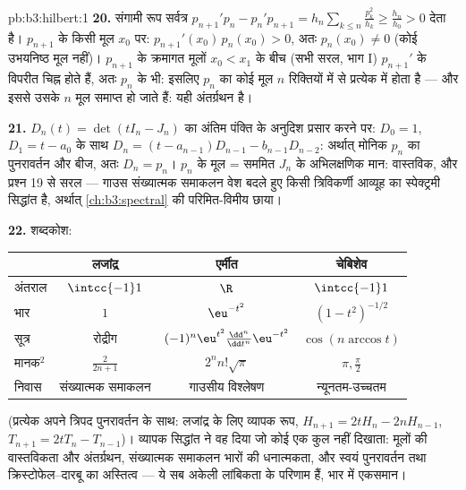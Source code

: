 \begin{solution}{pb:b3:hilbert:1}
\textbf{20.} संगामी रूप सर्वत्र $p_{n+1}'p_n -
p_n'p_{n+1} = h_n\sum_{k\leq n}\frac{p_k^2}{h_k} \geq
\frac{h_n}{h_0} > 0$ देता है। $p_{n+1}$ के किसी मूल
$x_0$ पर: $p_{n+1}'(x_0)\,p_n(x_0) > 0$, अतः $p_n(x_0) \neq
0$ (कोई उभयनिष्ठ मूल नहीं)। $p_{n+1}$ के क्रमागत
मूलों $x_0 < x_1$ के बीच (सभी सरल, भाग I) $p_{n+1}'$ के विपरीत चिह्न होते हैं,
अतः $p_n$ के भी: इसलिए $p_n$ का कोई मूल $n$ रिक्तियों में से
प्रत्येक में होता है --- और इससे उसके $n$ मूल समाप्त हो जाते हैं:
यही अंतर्ग्रथन है।

\textbf{21.} $D_n(t) = \det(tI_n - J_n)$ का अंतिम पंक्ति के अनुदिश प्रसार करने पर: $D_0 = 1$,
$D_1 = t - a_0$ के साथ $D_n = (t - a_{n-1})D_{n-1} - b_{n-1}D_{n-2}$: अर्थात् मोनिक $p_n$ का पुनरावर्तन और बीज, अतः
$D_n = p_n$। $p_n$ के मूल = सममित $J_n$ के अभिलक्षणिक मान: वास्तविक, और
प्रश्न 19 से सरल --- गाउस संख्यात्मक समाकलन वेश बदले हुए किसी
त्रिविकर्णी आव्यूह का स्पेक्ट्रमी सिद्धांत है, अर्थात् \cref{ch:b3:spectral} की
परिमित-विमीय छाया।

\textbf{22.} शब्दकोश:
\begin{center}
\begin{tabular}{l|c|c|c}
 & लजांद्र & एर्मीत & चेबिशेव\\
\hline
अंतराल & $\intcc{-1}1$ & $\R$ & $\intcc{-1}1$\\
भार & $1$ & $\eu^{-t^2}$ & $(1-t^2)^{-1/2}$\\
सूत्र & रोद्रीग & $(-1)^n\eu^{t^2}
\frac{\dd^n}{\dd t^n}\eu^{-t^2}$ & $\cos(n\arccos t)$\\
मानक$^2$ & $\frac2{2n+1}$ & $2^nn!\sqrt\pi$ & $\pi,
\frac\pi2$\\
निवास & संख्यात्मक समाकलन & गाउसीय विश्लेषण & न्यूनतम-उच्चतम\\
\end{tabular}
\end{center}
(प्रत्येक अपने त्रिपद पुनरावर्तन के साथ: लजांद्र के लिए व्यापक रूप,
$H_{n+1} = 2tH_n - 2nH_{n-1}$, $T_{n+1} = 2tT_n -
T_{n-1}$)। व्यापक सिद्धांत ने वह दिया जो कोई एक कुल नहीं दिखाता:
मूलों की वास्तविकता और अंतर्ग्रथन, संख्यात्मक समाकलन भारों की
धनात्मकता, और स्वयं पुनरावर्तन तथा क्रिस्टोफेल--दारबू का अस्तित्व
--- ये सब अकेली लांबिकता के परिणाम हैं, भार में एकसमान।


\end{solution}
